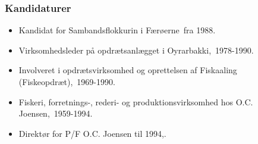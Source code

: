 \documentclass[11pt, a4paper]{awesome-cv}
\begin{document}
\begin{cvletter}
\subsubsection*{Kandidaturer}
\begin{itemize}
\item Kandidat for Sambandsflokkurin i Færøerne fra 1988.
\end{itemize}
\begin{itemize}
\item Virksomhedsleder på opdrætsanlægget i Oyrarbakki, 1978-1990.
\item Involveret i opdrætsvirksomhed og oprettelsen af Fiskaaling (Fiskeopdræt), 1969-1990.
\item Fiskeri, forretnings-, rederi- og produktionsvirksomhed hos O.C. Joensen, 1959-1994.
\item Direktør for P/F O.C. Joensen til 1994,.
\end{itemize}
\end{cvletter}
\end{document}
